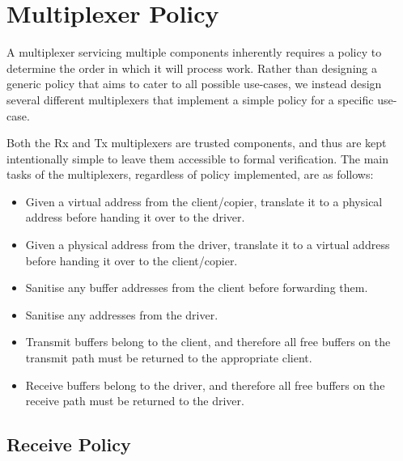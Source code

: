 \section{Multiplexer Policy} \label{s:mux_pol}

A multiplexer servicing multiple components inherently requires a policy to
determine the order in which it will process work. Rather than designing a generic policy
that aims to cater to all possible use-cases, we instead
design several different multiplexers that implement a simple policy for a specific use-case. 

Both the Rx and Tx multiplexers are trusted components,
and thus are kept intentionally simple to leave them accessible to formal verification.
The main tasks of the multiplexers, regardless of policy implemented, are as follows:

\begin{itemize}
    \item Given a virtual address from the client/copier, translate it to a physical address before
            handing it over to the driver.
    \item Given a physical address from the driver, translate it to a virtual address before
            handing it over to the client/copier.
    \item Sanitise any buffer addresses from the client before forwarding them.
    \item Sanitise any addresses from the driver. 
    \item Transmit buffers belong to the client, and therefore all free buffers on the transmit path
            must be returned to the appropriate client.
    \item Receive buffers belong to the driver, and therefore all free buffers on the receive path
            must be returned to the driver.
\end{itemize}


\subsection{Receive Policy}\label{s:rx_policy}

